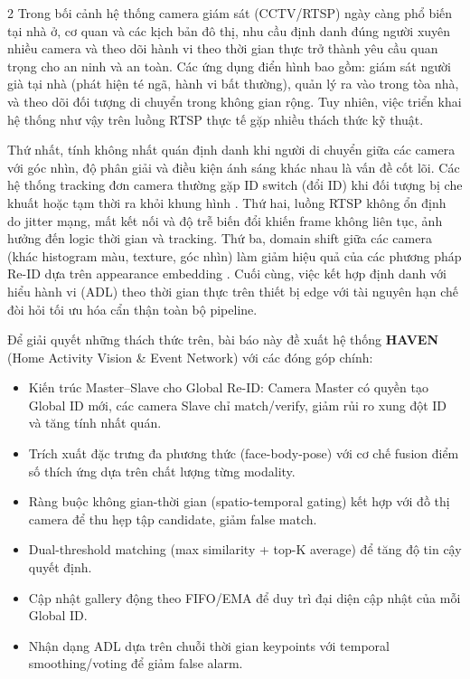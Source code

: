 \documentclass[a4paper,13pt]{article}
\begin{document}
\begin{multicols}{2}
Trong bối cảnh hệ thống camera giám sát (CCTV/RTSP) ngày càng phổ biến tại nhà ở, cơ quan và các kịch bản đô thị, nhu cầu định danh đúng người xuyên nhiều camera và theo dõi hành vi theo thời gian thực trở thành yêu cầu quan trọng cho an ninh và an toàn. Các ứng dụng điển hình bao gồm: giám sát người già tại nhà (phát hiện té ngã, hành vi bất thường), quản lý ra vào trong tòa nhà, và theo dõi đối tượng di chuyển trong không gian rộng. Tuy nhiên, việc triển khai hệ thống như vậy trên luồng RTSP thực tế gặp nhiều thách thức kỹ thuật.

Thứ nhất, tính không nhất quán định danh khi người di chuyển giữa các camera với góc nhìn, độ phân giải và điều kiện ánh sáng khác nhau là vấn đề cốt lõi. Các hệ thống tracking đơn camera thường gặp ID switch (đổi ID) khi đối tượng bị che khuất hoặc tạm thời ra khỏi khung hình \cite{zhang2022bytetrack}. Thứ hai, luồng RTSP không ổn định do jitter mạng, mất kết nối và độ trễ biến đổi khiến frame không liên tục, ảnh hưởng đến logic thời gian và tracking. Thứ ba, domain shift giữa các camera (khác histogram màu, texture, góc nhìn) làm giảm hiệu quả của các phương pháp Re-ID dựa trên appearance embedding \cite{zheng2015scalable}. Cuối cùng, việc kết hợp định danh với hiểu hành vi (ADL) theo thời gian thực trên thiết bị edge với tài nguyên hạn chế đòi hỏi tối ưu hóa cẩn thận toàn bộ pipeline.

Để giải quyết những thách thức trên, bài báo này đề xuất hệ thống \textbf{HAVEN} (Home Activity Vision \& Event Network) với các đóng góp chính:
\begin{itemize}
    \item Kiến trúc Master--Slave cho Global Re-ID: Camera Master có quyền tạo Global ID mới, các camera Slave chỉ match/verify, giảm rủi ro xung đột ID và tăng tính nhất quán.
    \item Trích xuất đặc trưng đa phương thức (face-body-pose) với cơ chế fusion điểm số thích ứng dựa trên chất lượng từng modality.
    \item Ràng buộc không gian-thời gian (spatio-temporal gating) kết hợp với đồ thị camera để thu hẹp tập candidate, giảm false match.
    \item Dual-threshold matching (max similarity + top-K average) để tăng độ tin cậy quyết định.
    \item Cập nhật gallery động theo FIFO/EMA để duy trì đại diện cập nhật của mỗi Global ID.
    \item Nhận dạng ADL dựa trên chuỗi thời gian keypoints với temporal smoothing/voting để giảm false alarm.
\end{itemize}


\end{multicols}
\end{document}
